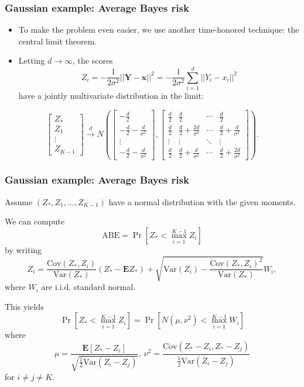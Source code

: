 \documentclass{beamer}
\newcommand{\E}{\textbf{E}}
\newcommand{\Cov}{\text{Cov}}
\newcommand{\Var}{\text{Var}}
\newcommand{\bx}{\boldsymbol{x}}
\newcommand{\bY}{\boldsymbol{Y}}
\begin{document}
\begin{frame}
\frametitle{Gaussian example: Average Bayes risk}
\begin{itemize}
\item To make the problem even easier, we use another time-honored technique: the central limit theorem.
\item Letting $d \to \infty$, the scores
\[
Z_i = -\frac{1}{2\sigma^2} ||\bY - \bx||^2 = -\frac{1}{2\sigma^2} \sum_{i=1}^d ||Y_i - x_i||^2
\]
have a jointly multivariate distribution in the limit:
\end{itemize}
\[
\begin{bmatrix}
Z_*\\
Z_1\\
\vdots\\
Z_{K-1}
\end{bmatrix} \stackrel{d}{\to} N\left(
\begin{bmatrix}
-\frac{d}{2}\\
-\frac{d}{2} - \frac{d}{\sigma^2}\\
\vdots\\
-\frac{d}{2} - \frac{d}{\sigma^2}
\end{bmatrix},
\begin{bmatrix}
\frac{d}{2} & \frac{d}{2} & \cdots & \frac{d}{2}\\
\frac{d}{2} & \frac{d}{2} + \frac{2d}{\sigma^2} & \cdots & \frac{d}{2} + \frac{d}{\sigma^2}\\
\vdots & \vdots & \ddots & \vdots\\
\frac{d}{2} & \frac{d}{2} + \frac{d}{\sigma^2} & \cdots & \frac{d}{2} + \frac{2d}{\sigma^2}
\end{bmatrix}
\right).
\]
\end{frame}

\begin{frame}
\frametitle{Gaussian example: Average Bayes risk}

Assume $(Z_*, Z_1,\hdots, Z_{K-1})$ have a normal distribution with the given moments.

We can compute
\[
\text{ABE} = \Pr[Z_* < \max_{i=1}^{K-1} Z_i]
\]
by writing
\[
Z_i = \frac{\Cov(Z_*, Z_i)}{\Var(Z_*)} (Z_* - \E Z_*) + \sqrt{\Var(Z_i) - \frac{\Cov(Z_*, Z_i)^2}{\Var(Z_*)}} W_i,
\]
where $W_i$ are i.i.d. standard normal.

This yields
\[
\Pr[Z_* < \max_{i=1}^{K-1} Z_i] = \Pr[N(\mu, \nu^2) < \max_{i=1}^{K-1} W_i]
\]
where
\[
\mu = \frac{\E[Z_* - Z_i]}{\sqrt{\frac{1}{2}\Var(Z_i - Z_j)}},\ \nu^2 = \frac{\Cov(Z_* - Z_i, Z_* - Z_j)}{\frac{1}{2}\Var(Z_i - Z_j)}
\]
for $i \neq j \neq K$.

\end{frame}
\end{document}

